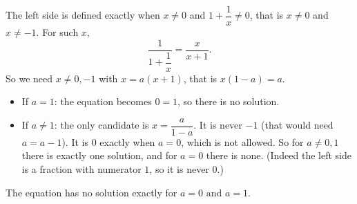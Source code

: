 The left side is defined exactly when $x\ne0$ and $1+\dfrac{1}{x}\ne0$, that is $x\ne0$ and $x\ne-1$. For such $x$,
\[
\dfrac{1}{1+\dfrac{1}{x}}=\dfrac{x}{x+1}.
\]
So we need $x\ne0,-1$ with $x=a(x+1)$, that is $x(1-a)=a$.
\begin{itemize}
\item If $a=1$: the equation becomes $0=1$, so there is no solution.
\item If $a\ne1$: the only candidate is $x=\dfrac{a}{1-a}$. It is never $-1$ (that would need $a=a-1$). It is $0$ exactly when $a=0$, which is not allowed. So for $a\ne0,1$ there is exactly one solution, and for $a=0$ there is none. (Indeed the left side is a fraction with numerator $1$, so it is never $0$.)
\end{itemize}
The equation has no solution exactly for $\boxed{a=0\text{ and }a=1}$.
